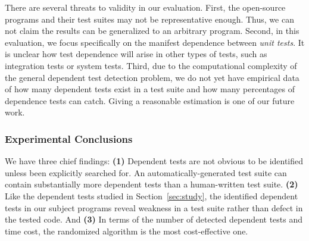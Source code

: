 There are several threats to validity in our evaluation.
First, the \subjnum open-source
programs and their test suites may not be
representative enough. Thus, we can not claim the results
can be generalized to an arbitrary program.
Second, in this evaluation, we focus specifically on
the {manifest dependence} between \textit{unit tests}.
It is unclear how test dependence will arise
in other types of tests, such as integration tests
or system tests.
Third, due to the computational complexity of the general dependent test
detection problem, we do not yet have
empirical data of how many dependent
tests exist in a test suite and how many percentages of dependence tests
\ourtool can catch.  Giving a reasonable estimation is one of our future work.


\subsubsection{Experimental Conclusions}


We have three chief findings: \textbf{(1)}
Dependent tests are not obvious to be identified
unless been explicitly searched for.
An automatically-generated test suite can contain
substantially more dependent tests than a human-written
test suite.
\textbf{(2)} Like the dependent tests
studied in Section~\ref{sec:study}, the identified
dependent tests in our subject programs reveal weakness
in a test suite rather than defect in the tested code.
And \textbf{(3)} In terms
of the number of detected dependent tests
and time cost, the randomized algorithm is the
most cost-effective one.

